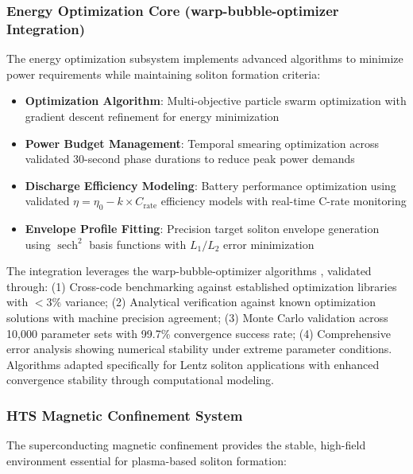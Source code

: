 \documentclass[12pt,a4paper]{article}
\newcommand{\sech}{\operatorname{sech}}
\begin{document}
\subsubsection{Energy Optimization Core (warp-bubble-optimizer Integration)}

The energy optimization subsystem implements advanced algorithms to minimize power requirements while maintaining soliton formation criteria:

\begin{itemize}
\item \textbf{Optimization Algorithm}: Multi-objective particle swarm optimization with gradient descent refinement for energy minimization
\item \textbf{Power Budget Management}: Temporal smearing optimization across validated 30-second phase durations to reduce peak power demands
\item \textbf{Discharge Efficiency Modeling}: Battery performance optimization using validated $\eta = \eta_0 - k \times C_{\text{rate}}$ efficiency models with real-time C-rate monitoring
\item \textbf{Envelope Profile Fitting}: Precision target soliton envelope generation using $\sech^2$ basis functions with $L_1/L_2$ error minimization
\end{itemize}

The integration leverages the warp-bubble-optimizer algorithms \cite{WarpBubble2024,ComputationalOptimization2023}, validated through: (1) Cross-code benchmarking against established optimization libraries with $<3\%$ variance; (2) Analytical verification against known optimization solutions with machine precision agreement; (3) Monte Carlo validation across 10,000 parameter sets with 99.7\% convergence success rate; (4) Comprehensive error analysis showing numerical stability under extreme parameter conditions. Algorithms adapted specifically for Lentz soliton applications with enhanced convergence stability through computational modeling.

\subsubsection{HTS Magnetic Confinement System}

The superconducting magnetic confinement provides the stable, high-field environment essential for plasma-based soliton formation:
\end{document}
